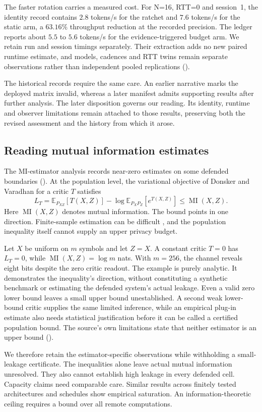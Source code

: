 The faster rotation carries a measured cost. For N=16, RTT=0 and session~1,
the identity record contains $2.8$ tokens/s for the ratchet and $7.6$
tokens/s for the static arm, a $63.16\%$ throughput reduction at the
recorded precision. The ledger reports about $5.5$ to $5.6$ tokens/s for
the evidence-triggered budget arm. We retain run and session
timings separately. Their extraction adds no new paired runtime estimate,
and models, cadences and RTT twins remain separate observations rather
than independent pooled replications ().

The historical records require the same care. An earlier narrative marks
the deployed matrix invalid, whereas a later manifest admits supporting
results after further analysis. The later disposition governs our reading.
Its identity, runtime and observer limitations remain attached to those
results, preserving both the revised assessment and the history from
which it arose.

\subsection{Reading mutual information estimates}

The MI-estimator analysis records near-zero estimates on some defended
boundaries (). At the population level, the variational
objective of Donsker and Varadhan for a critic $T$ satisfies
\begin{equation}
 L_T=\mathbb E_{P_{XZ}}[T(X,Z)]-
 \log\mathbb E_{P_XP_Z}[e^{T(X,Z)}]\le \operatorname{MI}(X,Z).
 \label{eq:dv}
\end{equation}
Here $\operatorname{MI}(X,Z)$ denotes mutual information. The bound points
in one direction. Finite-sample estimation can be difficult
\cite{song2020,mcallester2020}, and the population inequality itself
cannot supply an upper privacy budget.

Let $X$ be uniform on $m$ symbols and let $Z=X$. A constant critic $T=0$
has $L_T=0$, while $\operatorname{MI}(X,Z)=\log m$ nats. With $m=256$,
the channel reveals eight bits despite the zero critic readout. The example
is purely analytic. It demonstrates the inequality's direction, without
constituting a synthetic benchmark or estimating the defended system's
actual leakage. Even a valid zero lower bound leaves a small upper bound
unestablished. A second weak lower-bound critic supplies the same limited
inference, while an empirical plug-in estimate also needs statistical
justification before it can be called a certified population bound. The
source's own limitations state that neither estimator is an upper bound
().

We therefore retain the estimator-specific observations while withholding
a small-leakage certificate. The inequalities alone leave actual mutual
information unresolved. They also cannot establish high leakage in every
defended cell. Capacity claims need comparable care.
Similar results across finitely tested architectures and schedules show
empirical saturation. An information-theoretic ceiling requires a bound
over all remote computations.
